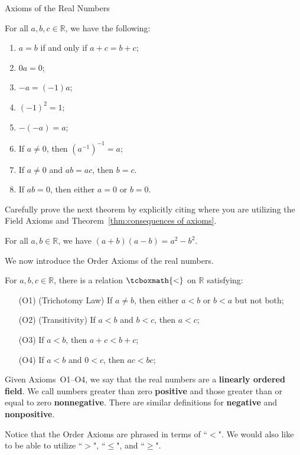 \begin{section}{Axioms of the Real Numbers}
\begin{theorem}\label{thm:consequences of axioms}
For all $a,b,c\in\mathbb{R}$, we have the following:
\begin{enumerate}[label=\textrm{(\alph*)}]
\item $a=b$ if and only if $a+c=b+c$;
\item $0a=0$;
\item $-a=(-1)a$;
\item $(-1)^2 = 1$;
\item $-(-a)=a$;
\item If $a\neq 0$, then $(a^{-1})^{-1}=a$;
\item If $a\neq 0$ and $ab = ac$, then $b = c$.
\item If $ab=0$, then either $a=0$ or $b=0$.
\end{enumerate}
\end{theorem}

Carefully prove the next theorem by explicitly citing where you are utilizing the Field Axioms and Theorem~\ref{thm:consequences of axioms}.

\begin{theorem}
For all $a,b\in\mathbb{R}$, we have $(a+b)(a-b)=a^2-b^2$.
\end{theorem}

We now introduce the Order Axioms of the real numbers.

\begin{orderaxioms}\label{axiom:order axioms}
For $a,b,c\in \mathbb{R}$, there is a relation $\tcboxmath{<}$ on $\mathbb{R}$ satisfying:
\begin{enumerate}
\item[(O1)] (Trichotomy Law) If $a\neq b$, then either $a<b$ or $b<a$ but not both;
\item[(O2)] (Transitivity) If $a<b$ and $b<c$, then $a<c$;
\item[(O3)] If $a<b$, then $a+c<b+c$;
\item[(O4)] If $a<b$ and $0<c$, then $ac<bc$;  
\end{enumerate}
\end{orderaxioms}

Given Axioms~O1--O4, we say that the real numbers are a \textbf{linearly ordered field}. We call numbers greater than zero \textbf{positive} and those greater than or equal to zero \textbf{nonnegative}. There are similar definitions for \textbf{negative} and \textbf{nonpositive}. 

Notice that the Order Axioms are phrased in terms of ``$<$". We would also like to be able to utilize ``$>$", ``$\leq$", and ``$\geq$".


\end{section}
